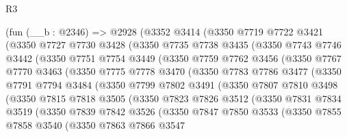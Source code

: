 \begin{lexlean}{R3}
\begin{coremodule}
    (fun (__b : @2346) =>
    @2928
      (@3352
        @3414
        (@3350
          @7719
          @7722
          @3421
          (@3350
            @7727
            @7730
            @3428
            (@3350
              @7735
              @7738
              @3435
              (@3350
                @7743
                @7746
                @3442
                (@3350
                  @7751
                  @7754
                  @3449
                  (@3350
                    @7759
                    @7762
                    @3456
                    (@3350
                      @7767
                      @7770
                      @3463
                      (@3350
                        @7775
                        @7778
                        @3470
                        (@3350
                          @7783
                          @7786
                          @3477
                          (@3350
                            @7791
                            @7794
                            @3484
                            (@3350
                              @7799
                              @7802
                              @3491
                              (@3350
                                @7807
                                @7810
                                @3498
                                (@3350
                                  @7815
                                  @7818
                                  @3505
                                  (@3350
                                    @7823
                                    @7826
                                    @3512
                                    (@3350
                                      @7831
                                      @7834
                                      @3519
                                      (@3350
                                        @7839
                                        @7842
                                        @3526
                                        (@3350
                                          @7847
                                          @7850
                                          @3533
                                          (@3350
                                            @7855
                                            @7858
                                            @3540
                                            (@3350
                                              @7863
                                              @7866
                                              @3547

\end{coremodule}
\end{lexlean}
